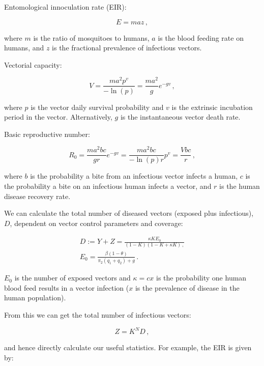 \noindent Entomological innoculation rate (EIR):

\begin{equation}
E = maz \,,
\end{equation}

where $m$ is the ratio of mosquitoes to humans, $a$ is the blood feeding rate on humans, and $z$ is the fractional prevalence of infectious vectors.

\noindent Vectorial capacity:

\begin{equation}
V = \frac{ma^2p^v}{-\ln(p)} = \frac{ma^2}{g}e^{-gv} \,,
\end{equation}

where $p$ is the vector daily survival probability and $v$ is the extrinsic incubation period in the vector. Alternatively, $g$ is the instantaneous vector death rate.

\noindent Basic reproductive number:

\begin{equation}
R_0 = \frac{ma^2bc}{gr}e^{-gv} = \frac{ma^2bc}{-\ln(p)r}p^v = \frac{Vbc}{r} \,,
\end{equation}

where $b$ is the probability a bite from an infectious vector infects a human, $c$ is the probability a bite on an infectious human infects a vector, and $r$ is the human disease recovery rate.

\noindent We can calculate the total number of diseased vectors (exposed plus infectious), $D$, dependent on vector control parameters and coverage:

\begin{eqnarray}
D := Y+Z = \frac{\kappa KE_0}{(1-K)(1-K+\kappa K) \,, }\\
E_0 = \frac{\beta(1-\theta)}{\pi_2(q_1+q_2)+g} \,.
\end{eqnarray}

$E_0$ is the number of exposed vectors and $\kappa = cx$ is the probability one human blood feed results in a vector infection ($x$ is the prevalence of disease in the human population).

\noindent From this we can get the total number of infectious vectors:

\begin{equation}
Z = K^ND\,,
\end{equation}

and hence directly calculate our useful statistics. For example, the EIR is given by:

